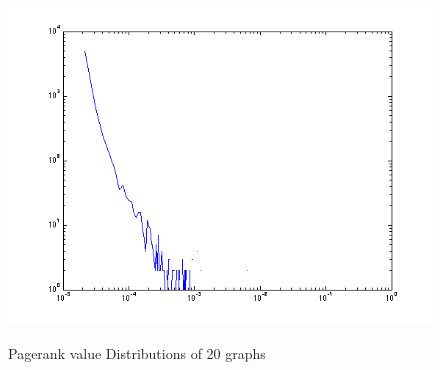 \begin{figure}
  {\includegraphics[width=.25\linewidth]{FIG/pagerank/soft-jdkdependency.txt.png}} \hfill  
  \hfill  
\caption{Pagerank value Distributions of 20 graphs}
\label{fig:pagerank}
\end{figure}

